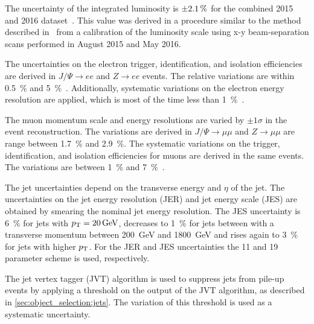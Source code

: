 \begin{description}[leftmargin=0cm]
    \item[Luminosity:] The uncertainty of the integrated luminosity is $\SI{\pm 2.1}{\percent}$ for the combined 2015 and 2016 dataset~\cite{LumiUncertRun2}.
        This value was derived in a procedure similar to the method described in~\cite{LumiUncertRun1}
        from a calibration of the luminosity scale using x-y beam-separation scans performed in August 2015 and May 2016.
    \item[Electrons:] The uncertainties on the electron trigger, identification, and isolation efficiencies
        are derived in $J/\Psi \to ee$ and $Z \to ee$ events. The relative variations are within \SI{0.5}{\percent}
        and \SI{5}{\percent}~\cite{ATLAS-CONF-2016-024,ElectronSFUncert}.
        Additionally, systematic variations on the electron energy resolution are applied, which is most of the
        time less than \SI{1}{\percent}~\cite{PERF-2013-05}.
    \item[Muons:] The muon momentum scale and energy resolutions are varied by $\pm 1 \sigma$
        in the event reconstruction. The variations are derived in $J/\Psi \to \mu\mu$ and $Z \to \mu\mu$
        are range between \SI{1.7}{\percent} and \SI{2.9}{\percent}.
        The systematic variations on the trigger, identification, and isolation efficiencies for muons
        are derived in the same events.
        The variations are between \SI{1}{\percent} and \SI{7}{\percent}~\cite{PERF-2015-10}.
    \item[Jet energy:] The jet uncertainties depend on the transverse energy and $\eta$ of the jet.
        The uncertainties on the jet energy resolution (JER) and jet energy scale (JES) are obtained
        by smearing the nominal jet energy resolution.
        The JES uncertainty is \SI{6}{\percent} for jets with $\pt = \SI{20}{\GeV}$,
        decreases to \SI{1}{\percent} for jets between with a transverse momentum between \SI{200}{\GeV} and \SI{1800}{\GeV} and rises again to \SI{3}{\percent}
        for jets with higher $p_\text{T}$.
        For the JER and JES uncertainties the 11 and 19 parameter scheme is used, respectively.~\cite{ATL-PHYS-PUB-2015-015,PERF-2016-04}
    \item[Jet vertex tagger:] The jet vertex tagger (JVT) algorithm is used to suppress jets from pile-up events
        by applying a threshold on the output of the JVT algorithm, as described in \cref{sec:object_selection:jets}.
        The variation of this threshold is used as a systematic uncertainty.

\end{description}
